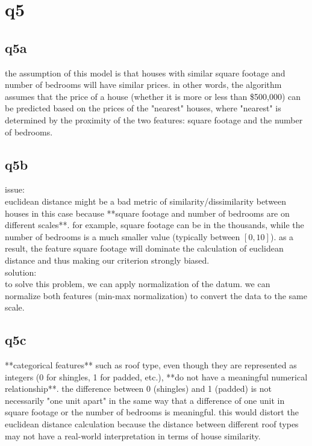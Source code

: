 \documentclass[12pt]{article}
\begin{document}
\newpage
\section{q5}
\subsection{q5a}
\begin{tcolorbox}[myblock, title = answer]
  the assumption of this model is that houses with similar square footage and number of bedrooms will have similar prices. in other words, the algorithm assumes that the price of a house (whether it is more or less than \$500,000) can be predicted based on the prices of the "nearest" houses, where "nearest" is determined by the proximity of the two features: square footage and the number of bedrooms.
\end{tcolorbox}

\newpage
\subsection{q5b}
\begin{tcolorbox}[myblock, title = answer]
  issue:\\
  euclidean distance might be a bad metric of similarity/dissimilarity between houses in this case because **square footage and number of bedrooms are on different scales**. for example, square footage can be in the thousands, while the number of bedrooms is a much smaller value (typically between $\left[ 0, 10 \right]$). as a result, the feature square footage will dominate the calculation of euclidean distance and thus making our criterion strongly biased. \\
  
  solution: \\
  to solve this problem, we can apply normalization of the datum. we can normalize both features (min-max normalization) to convert the data to the same scale.\\
\end{tcolorbox}

\newpage
\subsection{q5c}
\begin{tcolorbox}[myblock, title = answer]
  **categorical features** such as roof type, even though they are represented as integers (0 for shingles, 1 for padded, etc.), **do not have a meaningful numerical relationship**. the difference between 0 (shingles) and 1 (padded) is not necessarily "one unit apart" in the same way that a difference of one unit in square footage or the number of bedrooms is meaningful. this would distort the euclidean distance calculation because the distance between different roof types may not have a real-world interpretation in terms of house similarity.
\end{tcolorbox}
\end{document}
